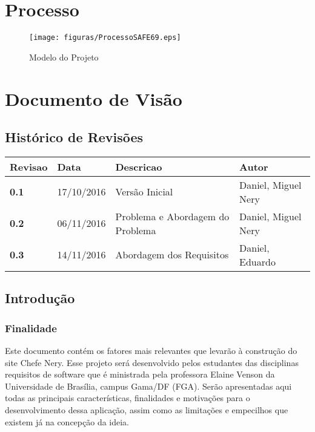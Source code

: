 \begin{apendicesenv}

\partapendices

\chapter{Processo}

\begin{figure}[h]
  \centering
  \label{fig01}
    \texttt{[image: figuras/ProcessoSAFE69.eps]}
  \caption{Modelo do Projeto}
\end{figure}

\chapter{Documento de Visão}

{\large {\section { Histórico de Revisões \\ } } }


\begin{tabular}{|l|l|l|l|}
  \hline
  \textbf{Revisao} & Data &  Descricao &  Autor \\ \hline
  \textbf{0.1} &  17/10/2016 &  Versão Inicial &  Daniel, Miguel Nery \\ \hline
  \textbf{0.2} &  06/11/2016 &  Problema e Abordagem do Problema &  Daniel, Miguel Nery \\ \hline
  \textbf{0.3} &  14/11/2016 &  Abordagem dos Requisitos & Daniel, Eduardo \\ \hline
\end{tabular}

{\large {\section { Introdução \\ } } }

{\subsection {Finalidade\\ }}
Este documento contém os fatores mais relevantes que levarão à construção do site Chefe Nery. Esse projeto será desenvolvido pelos estudantes das disciplinas requisitos de software que é ministrada pela professora Elaine Venson da Universidade de Brasília, campus Gama/DF (FGA). Serão apresentadas aqui todas as principais características, finalidades e motivações para o desenvolvimento dessa aplicação, assim como as limitações e empecilhos que existem já na concepção da ideia.
\\


\end{apendicesenv}
